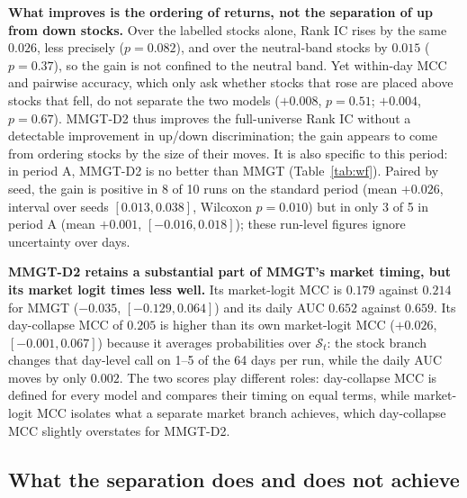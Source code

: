 \documentclass[conference]{IEEEtran}
\begin{document}
\textbf{What improves is the ordering of returns, not the separation of up from down
stocks.} Over the labelled stocks alone, Rank IC rises by the same $0.026$, less
precisely ($p=0.082$), and over the neutral-band stocks by $0.015$ ($p=0.37$), so the
gain is not confined to the neutral band. Yet within-day MCC and pairwise accuracy,
which only ask whether stocks that rose are placed above stocks that fell, do not
separate the two models ($+0.008$, $p=0.51$; $+0.004$, $p=0.67$). MMGT-D2 thus
improves the full-universe Rank IC without a detectable improvement in up/down
discrimination; the gain appears to come from ordering stocks by the size of their
moves. It is also specific to this period: in period A, MMGT-D2 is no better than
MMGT (Table~\ref{tab:wf}). Paired by seed, the gain is positive in 8 of 10 runs on
the standard period (mean $+0.026$, interval over seeds $[0.013, 0.038]$, Wilcoxon
$p=0.010$) but in only 3 of 5 in period A (mean $+0.001$, $[-0.016, 0.018]$); these
run-level figures ignore uncertainty over days.

\textbf{MMGT-D2 retains a substantial part of MMGT's market timing, but its market
logit times less well.} Its market-logit MCC is $0.179$ against $0.214$ for MMGT
($-0.035$, $[-0.129, 0.064]$) and its daily AUC $0.652$ against $0.659$. Its
day-collapse MCC of $0.205$ is higher than its own market-logit MCC ($+0.026$,
$[-0.001, 0.067]$) because it averages probabilities over $\mathcal{S}_t$: the stock
branch changes that day-level call on 1--5 of the 64 days per run, while the daily
AUC moves by only $0.002$. The two scores play different roles: day-collapse MCC is
defined for every model and compares their timing on equal terms, while market-logit
MCC isolates what a separate market branch achieves, which day-collapse MCC slightly
overstates for MMGT-D2.

\subsection{What the separation does and does not achieve}
\label{sec:probe}
\end{document}
